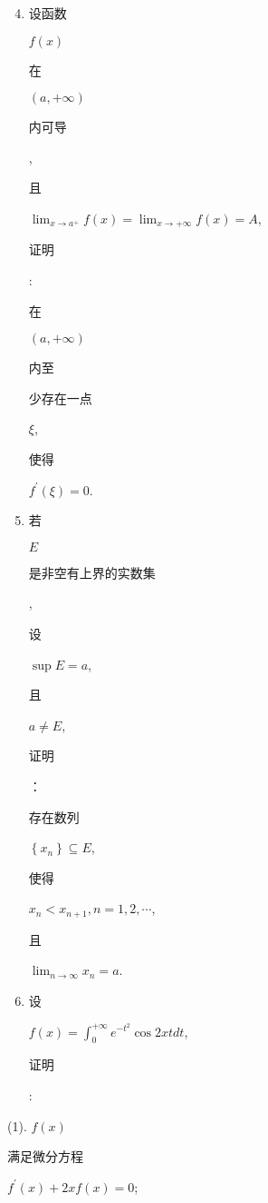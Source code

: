 \documentclass[10pt]{article}
\begin{document}
\begin{enumerate}
  \setcounter{enumi}{3}
  \item \begin{CJK}{UTF8}{mj}设函数\end{CJK} $f(x)$ \begin{CJK}{UTF8}{mj}在\end{CJK} $(a,+\infty)$ \begin{CJK}{UTF8}{mj}内可导\end{CJK}, \begin{CJK}{UTF8}{mj}且\end{CJK} $\lim _{x \rightarrow a^{+}} f(x)=\lim _{x \rightarrow+\infty} f(x)=A$, \begin{CJK}{UTF8}{mj}证明\end{CJK}: \begin{CJK}{UTF8}{mj}在\end{CJK} $(a,+\infty)$ \begin{CJK}{UTF8}{mj}内至\end{CJK} \begin{CJK}{UTF8}{mj}少存在一点\end{CJK} $\xi$, \begin{CJK}{UTF8}{mj}使得\end{CJK} $f^{\prime}(\xi)=0$.

  \item \begin{CJK}{UTF8}{mj}若\end{CJK} $E$ \begin{CJK}{UTF8}{mj}是非空有上界的实数集\end{CJK}, \begin{CJK}{UTF8}{mj}设\end{CJK} $\sup E=a$, \begin{CJK}{UTF8}{mj}且\end{CJK} $a \neq E$, \begin{CJK}{UTF8}{mj}证明\end{CJK}：\begin{CJK}{UTF8}{mj}存在数列\end{CJK} $\left\{x_{n}\right\} \subseteq E$, \begin{CJK}{UTF8}{mj}使得\end{CJK} $x_{n}<x_{n+1}, n=1,2, \cdots$, \begin{CJK}{UTF8}{mj}且\end{CJK} $\lim _{n \rightarrow \infty} x_{n}=a$.

  \item \begin{CJK}{UTF8}{mj}设\end{CJK} $f(x)=\int_{0}^{+\infty} e^{-t^{2}} \cos 2 x t d t$, \begin{CJK}{UTF8}{mj}证明\end{CJK}:

\end{enumerate}
(1). $f(x)$ \begin{CJK}{UTF8}{mj}满足微分方程\end{CJK} $f^{\prime}(x)+2 x f(x)=0$;
\end{document}
